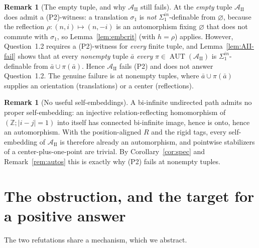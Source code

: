 \documentclass[12pt,fullpage]{article}
\theoremstyle{definition}
\newtheorem{remark}[theorem]{Remark}
\newcommand{\A}{\mathcal{A}}
\newcommand{\Z}{{\mathbb{Z}}}
\newcommand{\AUT}{\operatorname{AUT}}
\begin{document}
\begin{remark}[The empty tuple, and why $\A_{\mathrm{II}}$ still fails]\label{rem:empty-gap}
At the \emph{empty} tuple $\A_{\mathrm{II}}$ does admit a (P2)-witness: a
translation $\sigma_1$ is \emph{not} $\Sigma^{in}_1$-definable from $\varnothing$,
because the reflection $\rho:(n,i)\mapsto(n,-i)$ is an automorphism fixing
$\varnothing$ that does not commute with $\sigma_1$, so Lemma~\ref{lem:embcrit}
(with $h=\rho$) applies.  However, Question~1.2 requires a (P2)-witness for
\emph{every} finite tuple, and Lemma~\ref{lem:AII-fail} shows that at every
\emph{nonempty} tuple $\bar a$ \emph{every} $\pi\in\AUT(\A_{\mathrm{II}})$ is
$\Sigma^{in}_1$-definable from $\bar a\cup\pi(\bar a)$.  Hence $\A_{\mathrm{II}}$
fails (P2) and does not answer Question~1.2.  The genuine failure is at nonempty
tuples, where $\bar a\cup\pi(\bar a)$ supplies an orientation (translations) or a
center (reflections).
\end{remark}

\begin{remark}[No useful self-embeddings]\label{rem:II-emb}
A bi-infinite undirected path admits no proper self-embedding: an injective
relation-reflecting homomorphism of $(\Z;|i-j|=1)$ into itself has connected
bi-infinite image, hence is onto, hence an automorphism.  With the
position-aligned $R$ and the rigid tags, every self-embedding of
$\A_{\mathrm{II}}$ is therefore already an automorphism, and pointwise
stabilizers of a center-plus-one-point are trivial.  By
Corollary~\ref{cor:spec} and Remark~\ref{rem:autos} this is exactly why (P2)
fails at nonempty tuples.
\end{remark}

\section{The obstruction, and the target for a positive answer}\label{sec:obstruction}

The two refutations share a mechanism, which we abstract.
\end{document}
